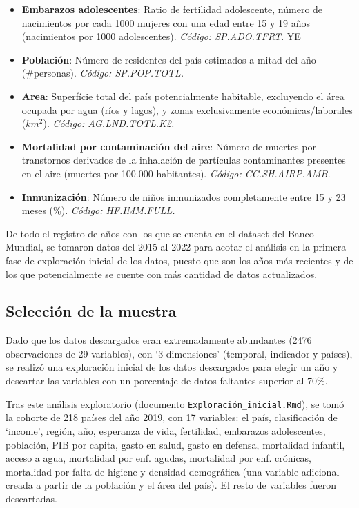 \documentclass[notspecified,article,submit,moreauthors,pdftex]{Definitions/mdpi}
\begin{document}
\begin{itemize}
  \textbf{Fertilidad}: Número de niños que daría a luz una mujer si
  viviese hasta el final de sus años fértiles en el momento temporal
  captado (nacimientos por mujer). \emph{Código: SP.DYN.TFRT.IN.}
\item
  \textbf{Embarazos adolescentes}: Ratio de fertilidad adolescente,
  número de nacimientos por cada 1000 mujeres con una edad entre 15 y 19
  años (nacimientos por 1000 adolescentes). \emph{Código: SP.ADO.TFRT}.
  YE
\item
  \textbf{Población}: Número de residentes del país estimados a mitad
  del año (\#personas). \emph{Código: SP.POP.TOTL.}
\item
  \textbf{Area}: Superfície total del país potencialmente habitable,
  excluyendo el área ocupada por agua (ríos y lagos), y zonas
  exclusivamente económicas/laborales (\(km^2\)). \emph{Código:
  AG.LND.TOTL.K2.}
\item
  \textbf{Mortalidad por contaminación del aire}: Número de muertes por
  transtornos derivados de la inhalación de partículas contaminantes
  presentes en el aire (muertes por 100.000 habitantes). \emph{Código:
  CC.SH.AIRP.AMB.}
\item
  \textbf{Inmunización}: Número de niños inmunizados completamente entre
  15 y 23 meses (\%). \emph{Código: HF.IMM.FULL.}
\end{itemize}

De todo el registro de años con los que se cuenta en el dataset del
Banco Mundial, se tomaron datos del 2015 al 2022 para acotar el análisis
en la primera fase de exploración inicial de los datos, puesto que son
los años más recientes y de los que potencialmente se cuente con más
cantidad de datos actualizados.

\subsection{Selección de la muestra}\label{selecciuxf3n-de-la-muestra}

Dado que los datos descargados eran extremadamente abundantes (2476
observaciones de 29 variables), con `3 dimensiones' (temporal, indicador
y países), se realizó una exploración inicial de los datos descargados
para elegir un año y descartar las variables con un porcentaje de datos
faltantes superior al 70\%.

Tras este análisis exploratorio (documento
\texttt{Exploración\_inicial.Rmd}), se tomó la cohorte de 218 países del
año 2019, con 17 variables: el país, clasificación de `income', región,
año, esperanza de vida, fertilidad, embarazos adolescentes, población,
PIB por capita, gasto en salud, gasto en defensa, mortalidad infantil,
acceso a agua, mortalidad por enf. agudas, mortalidad por enf. crónicas,
mortalidad por falta de higiene y densidad demográfica (una variable
adicional creada a partir de la población y el área del país). El resto
de variables fueron descartadas.
\end{document}
